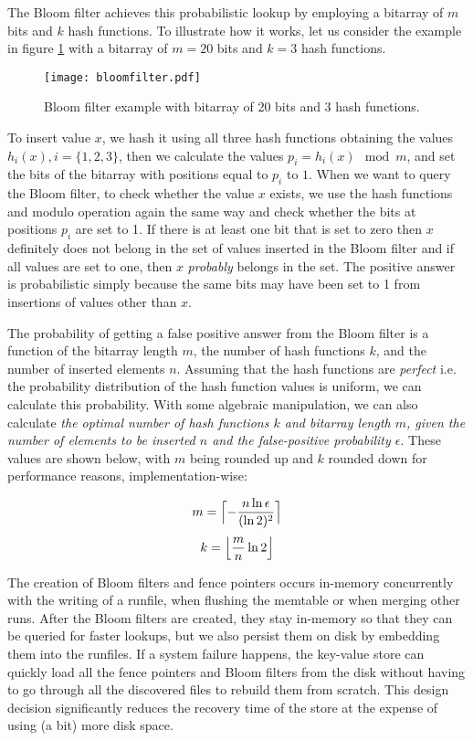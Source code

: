 The Bloom filter achieves this probabilistic lookup by employing a bitarray of $m$ bits and $k$ hash functions. To illustrate how it works, let us consider the example in figure \ref{fig:bloom-filter} with a bitarray of $m=20$ bits and $k=3$ hash functions.

\begin{figure}[h]
    \centering
    \texttt{[image: bloomfilter.pdf]}
    \caption{Bloom filter example with bitarray of 20 bits and 3 hash functions.}
    \label{fig:bloom-filter}
\end{figure}

To insert value $x$, we hash it using all three hash functions obtaining the values $h_i(x), i=\{1,2,3\}$, then we calculate the values $p_i = h_i(x)\mod{m}$, and set the bits of the bitarray with positions equal to $p_i$ to $1$. When we want to query the Bloom filter, to check whether the value $x$ exists, we use the hash functions and modulo operation again the same way and check whether the bits at positions $p_i$ are set to 1. If there is at least one bit that is set to zero then $x$ definitely does not belong in the set of values inserted in the Bloom filter and if all values are set to one, then $x$ \textit{probably} belongs in the set. The positive answer is probabilistic simply because the same bits may have been set to 1 from insertions of values other than $x$.

The probability of getting a false positive answer from the Bloom filter is a function of the bitarray length $m$, the number of hash functions $k$, and the number of inserted elements $n$. Assuming that the hash functions are \textit{perfect} i.e. the probability distribution of the hash function values is uniform, we can calculate this probability. With some algebraic manipulation, we can also calculate \textit{the optimal number of hash functions $k$ and bitarray length $m$, given the number of elements to be inserted $n$ and the false-positive probability $\epsilon$}. These values are shown below, with $m$ being rounded up and $k$ rounded down for performance reasons, implementation-wise:

$$ m = \Bigl\lceil-\frac{n\ln \epsilon}{(\ln 2)^2}\Bigr\rceil $$
$$ k = \Bigl\lfloor \frac{m}{n}\ln 2 \Bigr\rfloor$$

The creation of Bloom filters and fence pointers occurs in-memory concurrently with the writing of a runfile, when flushing the memtable or when merging other runs. After the Bloom filters are created, they stay in-memory so that they can be queried for faster lookups, but we also persist them on disk by embedding them into the runfiles. If a system failure happens, the key-value store can quickly load all the fence pointers and Bloom filters from the disk without having to go through all the discovered files to rebuild them from scratch. This design decision significantly reduces the recovery time of the store at the expense of using (a bit) more disk space.


